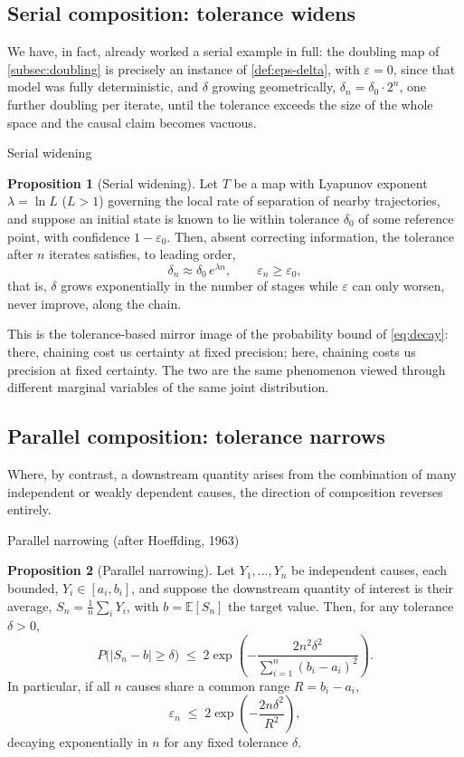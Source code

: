 \documentclass[11pt]{article}
\theoremstyle{definition}
\newtheorem{proposition}{Proposition}[section]
\newcommand{\eps}{\varepsilon}
\begin{document}
\subsection{Serial composition: tolerance widens}
\label{subsec:serial}

We have, in fact, already worked a serial example in full: the doubling map of \cref{subsec:doubling} is precisely an instance of \cref{def:eps-delta}, with $\eps=0$, since that model was fully deterministic, and $\delta$ growing geometrically, $\delta_n=\delta_0\cdot 2^n$, one further doubling per iterate, until the tolerance exceeds the size of the whole space and the causal claim becomes vacuous.

\begin{techbox}{Serial widening}
\begin{proposition}[Serial widening]
\label{prop:serial}
Let $T$ be a map with Lyapunov exponent $\lambda=\ln L$ ($L>1$) governing the local rate of separation of nearby trajectories, and suppose an initial state is known to lie within tolerance $\delta_0$ of some reference point, with confidence $1-\eps_0$. Then, absent correcting information, the tolerance after $n$ iterates satisfies, to leading order,
\[
\delta_n \approx \delta_0\, e^{\lambda n}, \qquad \eps_n \geq \eps_0,
\]
that is, $\delta$ grows exponentially in the number of stages while $\eps$ can only worsen, never improve, along the chain.
\end{proposition}
\end{techbox}

This is the tolerance-based mirror image of the probability bound of \cref{eq:decay}: there, chaining cost us certainty at fixed precision; here, chaining costs us precision at fixed certainty. The two are the same phenomenon viewed through different marginal variables of the same joint distribution.

\subsection{Parallel composition: tolerance narrows}
\label{subsec:parallel}

Where, by contrast, a downstream quantity arises from the combination of many independent or weakly dependent causes, the direction of composition reverses entirely.

\begin{techbox}{Parallel narrowing (after Hoeffding, 1963)}
\begin{proposition}[Parallel narrowing]
\label{prop:parallel}
Let $Y_1,\ldots,Y_n$ be independent causes, each bounded, $Y_i\in[a_i,b_i]$, and suppose the downstream quantity of interest is their average, $S_n=\tfrac1n\sum_i Y_i$, with $b=\mathbb E[S_n]$ the target value. Then, for any tolerance $\delta>0$,
\[
P\big(|S_n-b|\geq\delta\big) \;\leq\; 2\exp\!\left(-\frac{2n^2\delta^2}{\sum_{i=1}^n(b_i-a_i)^2}\right).
\]
In particular, if all $n$ causes share a common range $R=b_i-a_i$,
\[
\eps_n \;\leq\; 2\exp\!\left(-\frac{2n\delta^2}{R^2}\right),
\]
decaying exponentially in $n$ for any fixed tolerance $\delta$.
\end{proposition}
\end{techbox}
\end{document}
